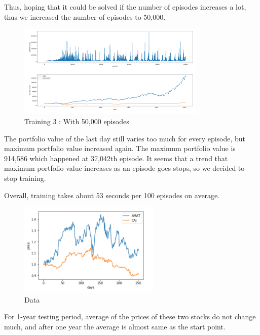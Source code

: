 Thus, hoping that it could be solved if the number of episodes increases a lot, thus we increased the number of episodes to 50,000.

\begin{figure}[H]
\begin{center}
\includegraphics[clip, width=0.8\textwidth]{Graphics/image9.png} \caption{Training 3 : With 50,000 episodes }
\end{center}
\end{figure}

The portfolio value of the last day still varies too much for every episode, but maximum portfolio value increased again. The maximum portfolio value is 914,586 which happened at 37,042th episode. It seems that a trend that maximum portfolio value increases as an episode goes stops, so we decided to stop training.  

Overall, training takes about 53 seconds per 100 episodes on average.

\begin{figure}[H]
\begin{center}
\includegraphics[clip, width=0.6\textwidth]{Graphics/image4.png} \caption{Data}
\end{center}
\end{figure}

For 1-year testing period, average of the prices of these two stocks do not change much, and after one year the average is almost same as the start point. 

